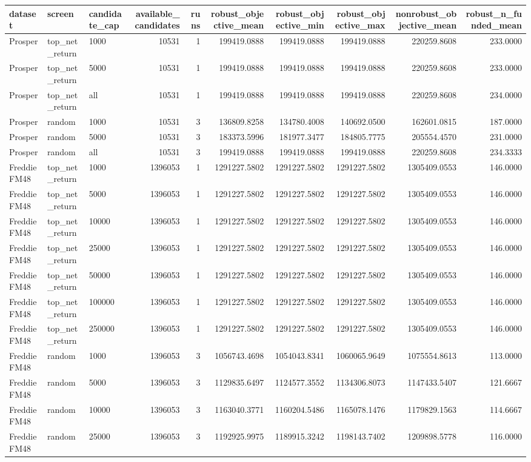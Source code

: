 \begin{tabular}{lllrrrrrrr}
\toprule
dataset & screen & candidate\_cap & available\_candidates & runs & robust\_objective\_mean & robust\_objective\_min & robust\_objective\_max & nonrobust\_objective\_mean & robust\_n\_funded\_mean \\
\midrule
Prosper & top\_net\_return & 1000 & 10531 & 1 & 199419.0888 & 199419.0888 & 199419.0888 & 220259.8608 & 233.0000 \\
Prosper & top\_net\_return & 5000 & 10531 & 1 & 199419.0888 & 199419.0888 & 199419.0888 & 220259.8608 & 233.0000 \\
Prosper & top\_net\_return & all & 10531 & 1 & 199419.0888 & 199419.0888 & 199419.0888 & 220259.8608 & 234.0000 \\
Prosper & random & 1000 & 10531 & 3 & 136809.8258 & 134780.4008 & 140692.0500 & 162601.0815 & 187.0000 \\
Prosper & random & 5000 & 10531 & 3 & 183373.5996 & 181977.3477 & 184805.7775 & 205554.4570 & 231.0000 \\
Prosper & random & all & 10531 & 3 & 199419.0888 & 199419.0888 & 199419.0888 & 220259.8608 & 234.3333 \\
Freddie FM48 & top\_net\_return & 1000 & 1396053 & 1 & 1291227.5802 & 1291227.5802 & 1291227.5802 & 1305409.0553 & 146.0000 \\
Freddie FM48 & top\_net\_return & 5000 & 1396053 & 1 & 1291227.5802 & 1291227.5802 & 1291227.5802 & 1305409.0553 & 146.0000 \\
Freddie FM48 & top\_net\_return & 10000 & 1396053 & 1 & 1291227.5802 & 1291227.5802 & 1291227.5802 & 1305409.0553 & 146.0000 \\
Freddie FM48 & top\_net\_return & 25000 & 1396053 & 1 & 1291227.5802 & 1291227.5802 & 1291227.5802 & 1305409.0553 & 146.0000 \\
Freddie FM48 & top\_net\_return & 50000 & 1396053 & 1 & 1291227.5802 & 1291227.5802 & 1291227.5802 & 1305409.0553 & 146.0000 \\
Freddie FM48 & top\_net\_return & 100000 & 1396053 & 1 & 1291227.5802 & 1291227.5802 & 1291227.5802 & 1305409.0553 & 146.0000 \\
Freddie FM48 & top\_net\_return & 250000 & 1396053 & 1 & 1291227.5802 & 1291227.5802 & 1291227.5802 & 1305409.0553 & 146.0000 \\
Freddie FM48 & random & 1000 & 1396053 & 3 & 1056743.4698 & 1054043.8341 & 1060065.9649 & 1075554.8613 & 113.0000 \\
Freddie FM48 & random & 5000 & 1396053 & 3 & 1129835.6497 & 1124577.3552 & 1134306.8073 & 1147433.5407 & 121.6667 \\
Freddie FM48 & random & 10000 & 1396053 & 3 & 1163040.3771 & 1160204.5486 & 1165078.1476 & 1179829.1563 & 114.6667 \\
Freddie FM48 & random & 25000 & 1396053 & 3 & 1192925.9975 & 1189915.3242 & 1198143.7402 & 1209898.5778 & 116.0000 \\
\bottomrule
\end{tabular}
